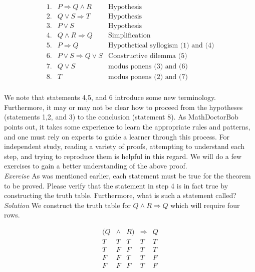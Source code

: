 \begin{displaymath}
\begin{matrix}
1. & P \Longrightarrow Q \land R & \text{Hypothesis} \\
2. & Q \lor S \Longrightarrow T & \text{Hypothesis} \\
3. & P \lor S & \text{Hypothesis} \\
4. & Q \land R \Longrightarrow Q  & \text{Simplification} \\
5. & P \Longrightarrow Q & \text{Hypothetical syllogism (1) and (4)} \\
6. & P \lor S \Longrightarrow Q \lor S & \text{Constructive dilemma (5)} \\
7. & Q \lor S & \text{modus ponens (3) and (6)} \\
8. & T & \text{modus ponens (2) and (7)} \\
\end{matrix}
\end{displaymath}


We note that statements 4,5, and 6 introduce some new terminology.  Furthermore, it may or may not be clear how to proceed from the hypotheses (statements 1,2, and 3) to the conclusion (statement 8).  As MathDoctorBob points out, it takes some experience to learn the appropriate rules and patterns, and one must rely on experts to guide a learner through this process.  For independent study, reading a variety of proofs, attempting to understand each step, and trying to reproduce them is helpful in this regard.  We will do a few exercises to gain a better understanding of the above proof.\\

\textit{Exercise}  As was mentioned earlier, each statement must be true for the theorem to be proved.  Please verify that the statement in step 4 is in fact true by constructing the truth table.  Furthermore, what is such a statement called?\\

\textit{Solution}  We construct the truth table for $Q \land R \Longrightarrow Q$ which will require four rows.

\begin{displaymath}
\begin{array}{|c|c|c|c|c|}
(Q & \land & R) & \Longrightarrow & Q \\
\hline
T & T & T & T &T \\
T & F & F & T &T \\
F & F & T & T &F \\
F & F & F & T &F \\
\end{array}
\end{displaymath}

